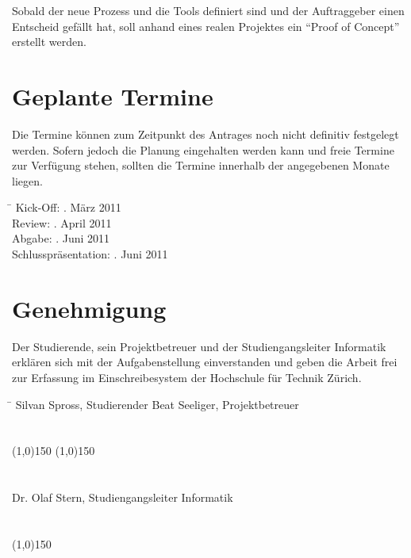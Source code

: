 \documentclass[]{scrreprt}
\begin{document}
    Sobald der neue Prozess und die Tools definiert sind und der Auftraggeber 
    einen Entscheid gefällt hat, soll anhand
    eines realen Projektes ein ``Proof of Concept'' erstellt werden.

    \section{Geplante Termine}
    Die Termine können zum Zeitpunkt des Antrages noch nicht definitiv 
    festgelegt werden. Sofern jedoch die Planung eingehalten werden kann und 
    freie Termine zur Verfügung stehen, sollten die Termine innerhalb der 
    angegebenen Monate liegen.

    \begin{tabbing}
        \hspace*{4cm}\= \kill
    	Kick-Off:               . März 2011\\
    	Review:                 . April 2011\\
    	Abgabe:                 . Juni 2011\\
    	Schlusspräsentation:    . Juni 2011 \\
    \end{tabbing}

    \section{Genehmigung}
    Der Studierende, sein Projektbetreuer und der Studiengangsleiter 
    Informatik erklären sich mit der Aufgabenstellung einverstanden und geben 
    die Arbeit frei zur Erfassung im Einschreibesystem der Hochschule für 
    Technik Zürich.

    \begin{tabbing}
        \hspace*{10cm}\= \kill
    	Silvan Spross, Studierender \> Beat Seeliger, Projektbetreuer \\\\\\
        \line(1,0){150} \> \line(1,0){150} \\\\\\
    	Dr. Olaf Stern, Studiengangsleiter Informatik \\\\\\
        \line(1,0){150}
    \end{tabbing}
    
    
    
    
\end{document}
